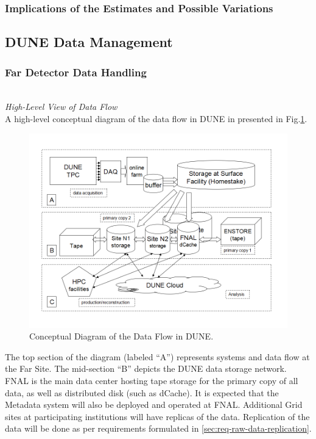 \subsubsection{Implications of the Estimates and Possible Variations}




\subsection{DUNE Data Management}
\subsubsection{Far Detector Data Handling}
\ 
\\
\noindent
\textit{High-Level View of Data Flow} 
\ 
\\

\noindent
A high-level conceptual diagram of the data flow in DUNE in presented in Fig.\ref{fig:DUNEdataflow}.
\begin{figure}[h!]
\centering
\includegraphics[width=\textwidth]{DUNEdataflow.png}
\caption{Conceptual Diagram of the Data Flow in DUNE.}
\label{fig:DUNEdataflow}
\end{figure}

\noindent
The top section of the diagram (labeled ``A'') represents systems and data flow at the Far Site.
The mid-section ``B'' depicts the DUNE data storage network. FNAL is the main data center
hosting tape storage for the primary copy of all data, as well as distributed disk (such as dCache).
It is expected that the Metadata system will also be deployed and operated at FNAL.
Additional Grid sites at participating institutions will have replicas of the data.
Replication of the data will be done as per requirements formulated in \ref{sec:req-raw-data-replication}.
\ 
\\

